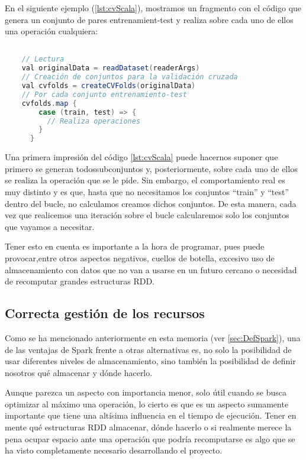 En el siguiente ejemplo (\ref{lst:cvScala}), mostramos un fragmento con el código que genera un conjunto de pares entrenamient-test y realiza sobre cada uno de ellos una operación cualquiera:

\begin{lstlisting}[language=Java,tabsize=4,frame = single,caption=Código de ejecución de una validación cruzada en Scala,captionpos=b,label=lst:cvScala,]

	// Lectura
	val originalData = readDataset(readerArgs)
	// Creación de conjuntos para la validación cruzada
    val cvfolds = createCVFolds(originalData)
    // Por cada conjunto entrenamiento-test
    cvfolds.map {
        case (train, test) => {
          // Realiza operaciones
        }
      }
\end{lstlisting}

Una primera impresión del código \ref{lst:cvScala} puede hacernos suponer que primero se generan todossubconjuntos y, posteriormente, sobre cada uno de ellos se realiza la operación que se le pide. Sin embargo, el comportamiento real es muy distinto y es que, hasta que no necesitamos los conjuntos ``train'' y ``test'' dentro del bucle, no calculamos creamos dichos conjuntos. De esta manera, cada vez que realicemos una iteración sobre el bucle calcularemos solo los conjuntos que vayamos a necesitar.

Tener esto en cuenta es importante a la hora de programar, pues puede provocar,entre otros aspectos negativos, cuellos de botella, excesivo uso de almacenamiento con datos que no van a usarse en un futuro cercano o necesidad de recomputar grandes estructuras RDD.

\subsection{Correcta gestión de los recursos}

Como se ha mencionado anteriormente en esta memoria (ver \ref{sec:DefSpark}), una de las ventajas de Spark frente a otras alternativas es, no solo la posibilidad de usar diferentes niveles de almacenamiento, sino también la posibilidad de definir nosotros qué almacenar y dónde hacerlo.

Aunque parezca un aspecto con importancia menor, solo útil cuando se busca optimizar al máximo una operación, lo cierto es que es un aspecto sumamente importante que tiene una altísima influencia en el tiempo de ejecución. Tener en mente qué estructuras RDD almacenar, dónde hacerlo o si realmente merece la pena ocupar espacio ante una operación que podría recomputarse es algo que se ha visto completamente necesario desarrollando el proyecto.


